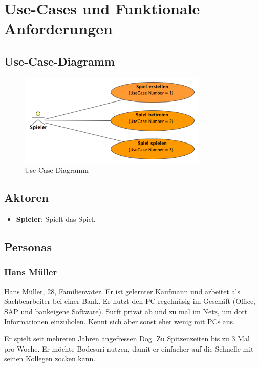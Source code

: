 \documentclass[12pt,halfparskip]{scrartcl}
\begin{document}


\section{Use-Cases und Funktionale Anforderungen} 
\subsection{Use-Case-Diagramm}\label{sub:use_case_diagramm} 
\begin{figure}
	[htp] \centering 
	\includegraphics[width=0.8\textwidth]{UseCaseDiagramm.png} \caption{Use-Case-Diagramm}\label{fig:UseCaseDiagramm.png} 
\end{figure}

\subsection{Aktoren}\label{sec:aktoren} 
\begin{itemize}
	\item \textbf{Spieler}: Spielt das Spiel. 
\end{itemize}

\subsection{Personas}\label{sec:personas} 

\subsubsection{Hans Müller}\label{sub:hans_müller} 

Hans Müller, 28, Familienvater. Er ist gelernter Kaufmann und arbeitet als Sachbearbeiter bei einer Bank. Er nutzt den PC regelmäsig im Geschäft (Office, SAP und bankeigene Software). Surft privat ab und zu mal im Netz, um dort Informationen einzuholen. Kennt sich aber sonst eher wenig mit PCs aus. 

Er spielt seit mehreren Jahren angefressen Dog. Zu Spitzenzeiten bis zu 3 Mal pro Woche. Er möchte Bodesuri nutzen, damit er einfacher auf die Schnelle mit seinen Kollegen zocken kann. 
\end{document}
